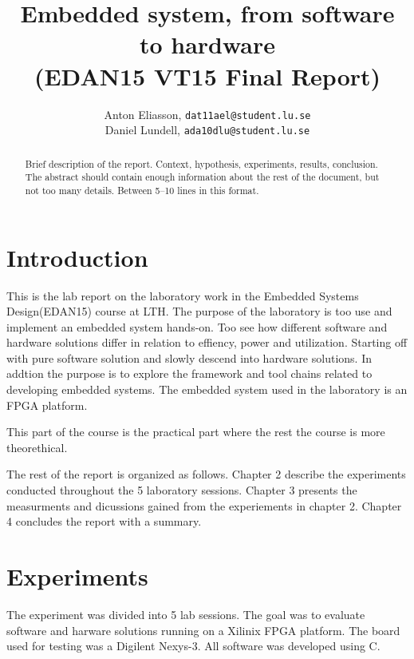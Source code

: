 \documentclass[11pt]{article}
\title{Embedded system, from software to hardware\\\small{(EDAN15 VT15 Final Report)}}
\author{
Anton Eliasson, \texttt{dat11ael@student.lu.se}\\
Daniel Lundell, \texttt{ada10dlu@student.lu.se}
}
\begin{document}
\lstset{
	language=C,
	captionpos=b,
	basicstyle=\footnotesize\ttfamily
}

\maketitle

\begin{abstract}
Brief description of the report. Context, hypothesis, experiments, results, conclusion. The abstract should contain enough
information about the rest of the document, but not too many details. Between 5--10 lines in this format.
\end{abstract}
\section{Introduction}
This is the lab report on the laboratory work in the Embedded Systems Design(EDAN15) course at LTH. The purpose of the laboratory is too use and implement an embedded system hands-on. Too see how different software and hardware solutions differ in relation to effiency, power and utilization. Starting off with pure software solution and slowly descend into hardware solutions. In addtion the purpose is to explore the framework and tool chains related to developing embedded systems. The embedded system used in the laboratory is an FPGA platform.

This part of the course is the practical part where the rest the course is more theorethical.

The rest of the report is organized as follows. Chapter 2 describe the experiments conducted throughout the 5 laboratory sessions. Chapter 3 presents the measurments and dicussions gained from the experiements in chapter 2. Chapter 4 concludes the report with a summary.



\section{Experiments}\label{sec:exp}
The experiment was divided into 5 lab sessions. The goal was to evaluate software and harware solutions running on a Xilinix FPGA platform. The board used for testing was a Digilent Nexys-3. All software was developed using C.  
\end{document}
